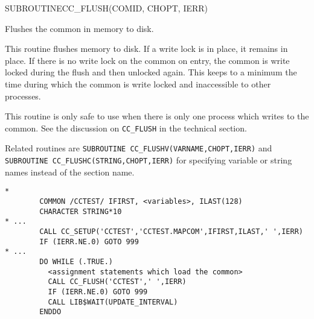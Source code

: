 \begin{routine} %
\subroutine
   {SUBROUTINE}{CC\_FLUSH}{(COMID, CHOPT, IERR)}
\begin{overview}
Flushes the common in memory to disk.
\end{overview}
\begin{argdeflist}
\end{argdeflist}
\begin{describe}

This routine flushes memory to disk. If a write lock is in place, it remains in
place. If there is no write lock on the common on entry, the
common is write locked during the flush and then unlocked
again. This keeps to a minimum the time during which the common is write
locked and inaccessible to other processes.

This routine is only safe to use when there is only one process which writes
to the common. See the discussion on \verb|CC_FLUSH| in the technical section.

Related routines are \verb|SUBROUTINE CC_FLUSHV(VARNAME,CHOPT,IERR)|
and \verb|SUBROUTINE CC_FLUSHC(STRING,CHOPT,IERR)| for specifying
variable or string names instead of the section name.

\end{describe}
\begin{options}
\end{options}
\begin{returncodes}
\end{returncodes}
\begin{examplecode}\begin{verbatim}
*
        COMMON /CCTEST/ IFIRST, <variables>, ILAST(128)
        CHARACTER STRING*10
* ...
        CALL CC_SETUP('CCTEST','CCTEST.MAPCOM',IFIRST,ILAST,' ',IERR)
        IF (IERR.NE.0) GOTO 999
* ...
        DO WHILE (.TRUE.)
          <assignment statements which load the common>
          CALL CC_FLUSH('CCTEST',' ',IERR)
          IF (IERR.NE.0) GOTO 999
          CALL LIB$WAIT(UPDATE_INTERVAL)
        ENDDO
\end{verbatim}\end{examplecode}
\end{routine}


